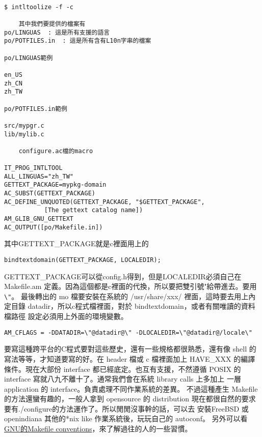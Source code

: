   \begin{verbatim} 

$ intltoolize -f -c

    其中我們要提供的檔案有
po/LINGUAS	: 這是所有支援的語言
po/POTFILES.in	: 這是所有含有L10n字串的檔案
    
po/LINGUAS範例
    
en_US
zh_CN
zh_TW
    
po/POTFILES.in範例
    
src/mypgr.c
lib/mylib.c
    
    configure.ac檔的macro
    
IT_PROG_INTLTOOL
ALL_LINGUAS="zh_TW"
GETTEXT_PACKAGE=mypkg-domain
AC_SUBST(GETTEXT_PACKAGE)
AC_DEFINE_UNQUOTED(GETTEXT_PACKAGE, "$GETTEXT_PACKAGE",
		   [The gettext catalog name])
AM_GLIB_GNU_GETTEXT
AC_OUTPUT([po/Makefile.in])
    \end{verbatim} 
    其中GETTEXT\_PACKAGE就是c裡面用上的
    \begin{verbatim} 
bindtextdomain(GETTEXT_PACKAGE, LOCALEDIR);
    \end{verbatim} 
    GETTEXT\_PACKAGE可以從config.h得到，但是LOCALEDIR必須自己在Makefile.am
    定義。因為這個都是c裡面的代換，所以要把雙引號"給帶進去。要用\verb=\"=。
    最後轉出的 mo 檔要安裝在系統的 /usr/share/xxx/ 裡面，這時要去用上內定目錄
    datadir，所以c程式檔裡面，對於 bindtextdomain，或者有關唯讀的資料檔路徑
    設定必須用上外面的環境變數。
    
    \begin{verbatim} 
AM_CFLAGS = -DDATADIR=\"@datadir@\" -DLOCALEDIR=\"@datadir@/locale\"
    \end{verbatim} 
    要寫這種跨平台的C程式要對這些歷史，還有一些規格都很熟悉，還有像 shell
    的寫法等等，才知道要寫的好。在 header 檔或 c 檔裡面加上
    HAVE\_XXX 的編譯條件。現在大部份 interface 都已經底定。也互有支援，不然遵循
    POSIX 的 interface 寫就八九不離十了。通常我們會在系統 library calls 上多加上
    一層 application 的 interface。負責處理不同作業系統的差異。
    不過這種產生 Makefile 的方法還蠻有趣的，一般人拿到 opensource 的 distribution
    現在都很自然的要求要有./configure的方法運作了。所以閒閒沒事幹的話，可以去
    安裝FreeBSD 或 openindiana 其他的*nix like 作業系統後，玩玩自己的 autoconf。
    另外可以看\href{https://www.gnu.org/prep/standards/html_node/Makefile-Conventions.html}
    {GNU的Makefile conventions}，來了解過往的人的一些習慣。
